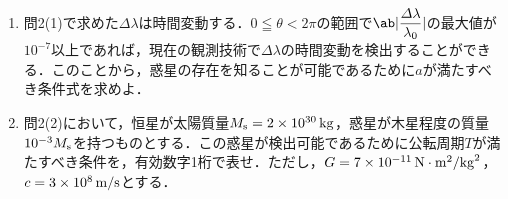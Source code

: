 \begin{enumerate}[I]
\begin{enumerate}[(1)]
      \item {\hzw}問2(1)で求めた$\varDelta \lambda$は時間変動する．$0 \leqq \theta < 2\pi$の範囲で$\ab|\dfrac{\varDelta \lambda}{\lambda_0}|$の最大値が$10^{-7}$以上であれば，現在の観測技術で$\varDelta \lambda$の時間変動を検出することができる．このことから，惑星の存在を知ることが可能であるために$a$が満たすべき条件式を求めよ．
      \item {\hzw}問2(2)において，恒星が太陽質量$M_\mathrm{s} = 2 \times 10^{30} \, \mathrm{kg}$，惑星が木星程度の質量$10^{-3}M_\mathrm{s}$を持つものとする．この惑星が検出可能であるために公転周期$T$が満たすべき条件を，有効数字1桁で表せ．ただし，$G = 7 \times 10^{-11}\,\mathrm{N}\cdot\mathrm{m}^2/\mathrm{kg}^2$，$c = 3 \times 10^{8} \, \mathrm{m/s}$とする．
    \end{enumerate}

\end{enumerate}
